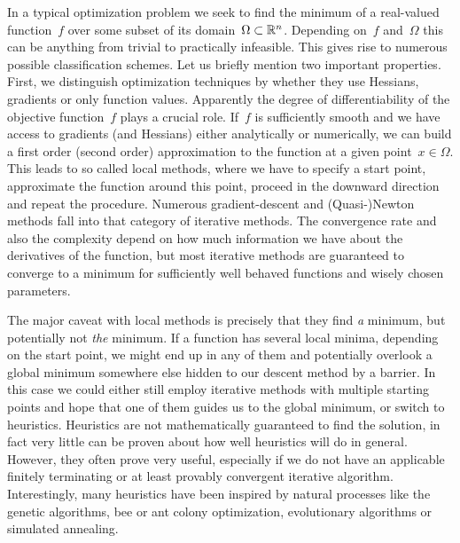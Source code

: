 In a typical optimization problem we seek to find the minimum of a real-valued
function~$f$ over some subset of its domain~$\Omega \subset \mathbb{R}^n$. Depending
on~$f$ and~$\Omega$ this can be anything from trivial to practically infeasible.
This gives rise to numerous possible classification schemes. Let us briefly
mention two important properties. First, we distinguish optimization techniques
by whether they use Hessians, gradients or only function values. Apparently the
degree of differentiability of the objective function~$f$ plays a crucial role.
If~$f$ is sufficiently smooth and we have access to gradients (and Hessians)
either analytically or numerically, we can build a first order (second order)
approximation to the function at a given point~$x \in \Omega$. This leads to so
called local methods, where we have to specify a start point, approximate the
function around this point, proceed in the downward direction and repeat the
procedure. Numerous gradient-descent and (Quasi-)Newton methods fall into that
category of iterative methods. The convergence rate and also the complexity
depend on how much information we have about the derivatives of the function,
but most iterative methods are guaranteed to converge to a minimum for
sufficiently well behaved functions and wisely chosen parameters.

The major caveat with local methods is precisely that they find \emph{a}
minimum, but potentially not \emph{the} minimum. If a function has several local
minima, depending on the start point, we might end up in any of them and
potentially overlook a global minimum somewhere else hidden to our descent
method by a barrier. In this case we could either still employ iterative methods
with multiple starting points and hope that one of them guides us to the global
minimum, or switch to heuristics. Heuristics are not mathematically guaranteed
to find the solution, in fact very little can be proven about how well
heuristics will do in general. However, they often prove very useful, especially
if we do not have an applicable finitely terminating or at least provably
convergent iterative algorithm. Interestingly, many heuristics have been
inspired by natural processes like the genetic algorithms, bee or ant colony
optimization, evolutionary algorithms or simulated annealing.

